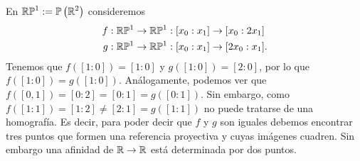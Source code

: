 \begin{eg}
En $\displaystyle \mathbb{R}\mathbb{P}^{1} := \mathbb{P}\left(\mathbb{R}^{2}\right) $ consideremos 
\[
\begin{split}
	f : \mathbb{R}\mathbb{P}^{1} & \to \mathbb{R}\mathbb{P}^{1} : [x_{0}:x_{1}]  \to [x_{0}:2x_{1}] \\
	g : \mathbb{R}\mathbb{P}^{1} & \to \mathbb{R}\mathbb{P}^{1} : [x_{0}:x_{1}] \to [2x_{0}:x_{1}].
\end{split}
\]
Tenemos que $\displaystyle f\left([1:0]\right)=[1:0] $ y $\displaystyle g\left([1:0]\right)= [2:0] $, por lo que $\displaystyle  f\left([1:0]\right) =  g\left([1:0]\right) $. Análogamente, podemos ver que $\displaystyle f\left([0,1]\right)=[0:2] = [0:1] = g\left([0:1]\right) $. Sin embargo, como $\displaystyle f\left([1:1]\right) = [1:2] \neq [2:1] = g\left([1:1]\right)$ no puede tratarse de una homografía. Es decir, para poder decir que $\displaystyle f $ y $\displaystyle g $ son iguales debemos encontrar tres puntos que formen una referencia proyectiva y cuyas imágenes cuadren. Sin embargo una afinidad de $\displaystyle \mathbb{R} \to \mathbb{R} $ está determinada por dos puntos. 
\end{eg}

